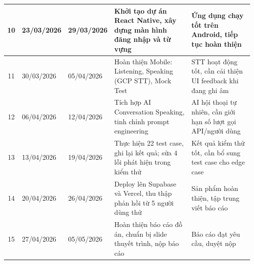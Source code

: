 \documentclass[a4paper,12pt]{extreport}
\begin{document}
\begin{longtable}{|c|p{2.0cm}|p{2.0cm}|p{5.0cm}|p{3.0cm}|}
    10 & 23/03/2026 & 29/03/2026 & Khởi tạo dự án React Native, xây dựng màn hình đăng nhập và từ vựng & Ứng dụng chạy tốt trên Android, tiếp tục hoàn thiện \\ \hline
    11 & 30/03/2026 & 05/04/2026 & Hoàn thiện Mobile: Listening, Speaking (GCP STT), Mock Test & STT hoạt động tốt, cần cải thiện UI feedback khi đang ghi âm \\ \hline
    12 & 06/04/2026 & 12/04/2026 & Tích hợp AI Conversation Speaking, tinh chỉnh prompt engineering & AI hội thoại tự nhiên, cần giới hạn số lượt gọi API/người dùng \\ \hline
    13 & 13/04/2026 & 19/04/2026 & Thực hiện 22 test case, ghi lại kết quả; sửa 4 lỗi phát hiện trong kiểm thử & Kết quả kiểm thử tốt, cần bổ sung test case cho edge case \\ \hline
    14 & 20/04/2026 & 26/04/2026 & Deploy lên Supabase và Vercel, thu thập phản hồi từ 5 người dùng thử & Sản phẩm hoàn thiện, tập trung viết báo cáo \\ \hline
    15 & 27/04/2026 & 05/05/2026 & Hoàn thiện báo cáo đồ án, chuẩn bị slide thuyết trình, nộp báo cáo & Báo cáo đạt yêu cầu, duyệt nộp \\ \hline
\end{longtable}
\end{document}
